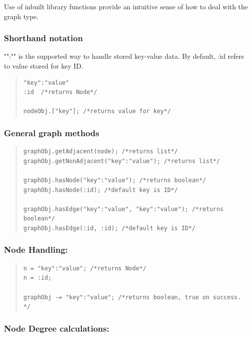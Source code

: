 \documentclass[a4paper]{article}
\begin{document}
\noindent Use of inbuilt library functions provide an intuitive sense of how to deal with the graph type.

\subsubsection{Shorthand notation}
\noindent "":"" is the supported way to handle stored key-value data.
\noindent By default, :id refers to value stored for key ID.

\begin{quote}
\begin{verbatim}
"key":"value"
:id  /*returns Node*/

nodeObj.["key"]; /*returns value for key*/
\end{verbatim}
\end{quote}

\subsubsection{General graph methods}
\begin{quote}
\begin{verbatim}
graphObj.getAdjacent(node); /*returns list*/
graphObj.getNonAdjacent("key":"value"); /*returns list*/

graphObj.hasNode("key":"value"); /*returns boolean*/
graphObj.hasNode(:id); /*default key is ID*/

graphObj.hasEdge("key":"value", "key":"value"); /*returns boolean*/
graphObj.hasEdge(:id, :id); /*default key is ID*/
\end{verbatim}
\end{quote}

\subsubsection{Node Handling:}

\begin{quote}
\begin{verbatim}
n = "key":"value"; /*returns Node*/
n = :id;

graphObj -= "key":"value"; /*returns boolean, true on success. */

\end{verbatim}
\end{quote}

\subsubsection{Node Degree calculations:}
\end{document}
